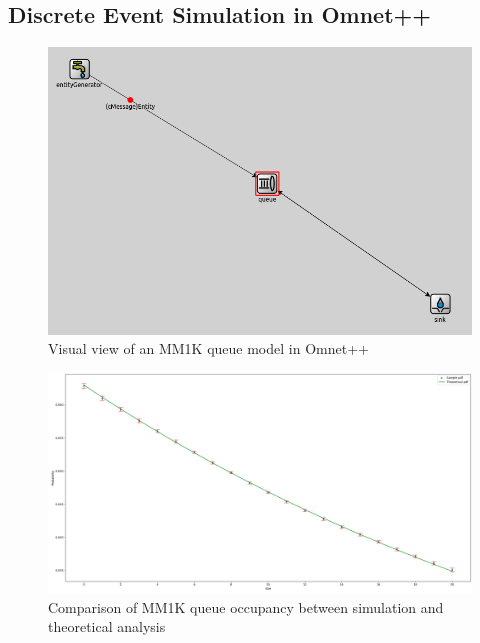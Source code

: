 \subsection{Discrete Event Simulation in Omnet++}
\begin{figure}[htb]
    \centering
    \includegraphics[width=\textwidth]{images/MM1K_sim.png}
    \caption{Visual view of an MM1K queue model in Omnet++}
    \label{fig:mm1k_sim}
\end{figure}
\begin{figure}[htb]
    \centering
    \includegraphics[width=\textwidth]{images/MM1k_analysis.png}
    \caption{Comparison of MM1K queue occupancy between simulation and theoretical analysis}
    \label{fig:MM1K_analysis}
\end{figure}
